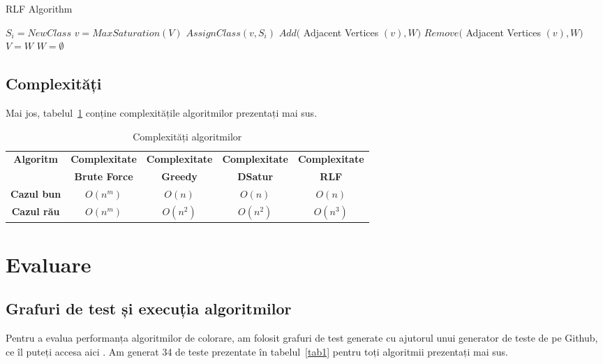 \documentclass[runningheads]{paper}
\begin{document}
\begin{algorithm}
\caption{RLF Algorithm}
\label{alg4}
\begin{algorithmic}[1]
\State $S_i = NewClass$
\State $v = MaxSaturation(V)$
\State $AssignClass(v, S_i)$
\State $Add($ Adjacent Vertices $(v), W)$
\State $Remove($ Adjacent Vertices $(v), W)$
\EndWhile
\State $V = W$
\State $W = \emptyset$
\EndWhile
\EndProcedure
\end{algorithmic}
\end{algorithm}

\subsection{Complexități}
Mai jos, tabelul~\ref{tabel_complexitate} conține complexitățile algoritmilor
prezentați mai sus.

\begin{table}[h]
\centering
\caption{Complexități algoritmilor}
\label{tabel_complexitate}
\begin{tabular}{|c|c|c|c|c|}
\hline

\textbf{Algoritm} & \textbf{Complexitate} & \textbf{Complexitate} & \textbf{Complexitate} & \textbf{Complexitate} \\
 & \textbf{Brute Force} & \textbf{Greedy} & \textbf{DSatur} & \textbf{RLF} \\
\hline
\hline
\textbf{Cazul bun} & $O(n^m)$ & $O(n)$ & $O(n)$ & $O(n)$ \\
\hline
\textbf{Cazul rău} & $O(n^m)$ & $O(n^2)$ & $O(n^2)$ & $O(n^3)$ \\
\hline
\end{tabular}
\end{table}

\section{Evaluare}
\subsection{Grafuri de test și execuția algoritmilor}
Pentru a evalua performanța algoritmilor de colorare, am folosit grafuri de test
generate cu ajutorul unui generator de teste de pe Github, ce îl puteți accesa aici \cite{16}.
Am generat 34 de teste prezentate în tabelul~\ref{tab1} pentru toți algoritmii
prezentați mai sus.
\end{document}
